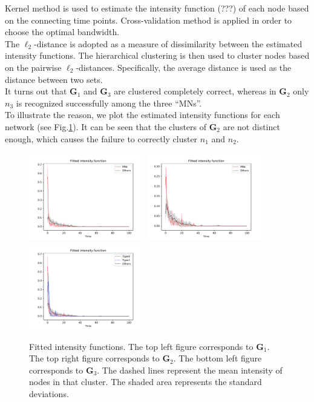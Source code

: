 \noindent
Kernel method is used to estimate the intensity function (???) of each node based on the connecting time points. 
Cross-validation method is applied in order to choose the optimal bandwidth.
\\
The $\ell_2$-distance is adopted as a measure of dissimilarity between the estimated intensity functions.
The hierarchical clustering is then used to cluster nodes based on the pairwise $\ell_2$-distances. Specifically, the average distance is used as the distance between two sets.
\\
It turns out that $\mathbf{G}_1$ and $\mathbf{G}_3$ are clustered completely correct, whereas in $\mathbf{G}_2$ only $n_3$ is recognized successfully among the three ``MNs''.
\\
To illustrate the reason, we plot the estimated intensity functions for each network (see Fig.\ref{Fig: fitted intensity functions}). It can be seen that the clusters of $\mathbf{G}_2$ are not distinct enough, which causes the failure to correctly cluster $n_1$ and $n_2$.
\begin{figure}[H]
\centering
\includegraphics[width = 0.45\textwidth]{Graphs/fitted_intensity.pdf}
\includegraphics[width = 0.45\textwidth]{Graphs/fitted_intensity_alpha05_lamda01.pdf}
\includegraphics[width = 0.45\textwidth]{Graphs/fitted_intensity_three_types.pdf}
\caption{Fitted intensity functions. The top left figure corresponds to $\mathbf{G}_1$. The top right figure corresponds to $\mathbf{G}_2$. The bottom left figure corresponds to $\mathbf{G}_3$. The dashed lines represent the mean intensity of nodes in that cluster. The shaded area represents the standard deviations.}
\label{Fig: fitted intensity functions}
\end{figure}
